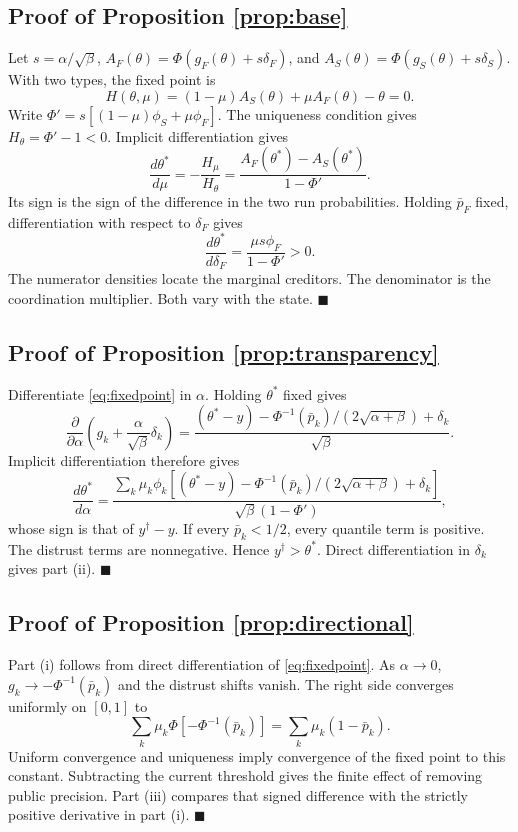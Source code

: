 \documentclass[11pt]{article}
\theoremstyle{definition}
\begin{document}
\subsection{Proof of Proposition \ref{prop:base}}
Let $s=\alpha/\sqrt\beta$, $A_F(\theta)=\Phi(g_F(\theta)+s\delta_F)$, and $A_S(\theta)=\Phi(g_S(\theta)+s\delta_S)$. With two types, the fixed point is
\[
H(\theta,\mu)=(1-\mu)A_S(\theta)+\mu A_F(\theta)-\theta=0.
\]
Write $\Phi'=s[(1-\mu)\phi_S+\mu\phi_F]$. The uniqueness condition gives $H_\theta=\Phi'-1<0$. Implicit differentiation gives
\[
\frac{d\theta^*}{d\mu}
=-\frac{H_\mu}{H_\theta}
=\frac{A_F(\theta^*)-A_S(\theta^*)}{1-\Phi'}.
\]
Its sign is the sign of the difference in the two run probabilities. Holding $\bar p_F$ fixed, differentiation with respect to $\delta_F$ gives
\[
\frac{d\theta^*}{d\delta_F}
=\frac{\mu s\phi_F}{1-\Phi'}>0.
\]
The numerator densities locate the marginal creditors. The denominator is the coordination multiplier. Both vary with the state. $\blacksquare$

\subsection{Proof of Proposition \ref{prop:transparency}}
Differentiate \eqref{eq:fixedpoint} in $\alpha$. Holding $\theta^*$ fixed gives
\[
\frac{\partial}{\partial\alpha}\left(g_k+\frac{\alpha}{\sqrt\beta}\delta_k\right)
=\frac{(\theta^*-y)-\Phi^{-1}(\bar p_k)/(2\sqrt{\alpha+\beta})+\delta_k}{\sqrt\beta}.
\]
Implicit differentiation therefore gives
\[
\frac{d\theta^*}{d\alpha}
=\frac{\sum_k\mu_k\phi_k\left[(\theta^*-y)-\Phi^{-1}(\bar p_k)/(2\sqrt{\alpha+\beta})+\delta_k\right]}{\sqrt\beta(1-\Phi')},
\]
whose sign is that of $y^\dagger-y$. If every $\bar p_k<1/2$, every quantile term is positive. The distrust terms are nonnegative. Hence $y^\dagger>\theta^*$. Direct differentiation in $\delta_k$ gives part (ii). $\blacksquare$

\subsection{Proof of Proposition \ref{prop:directional}}
Part (i) follows from direct differentiation of \eqref{eq:fixedpoint}. As $\alpha\to0$, $g_k\to-\Phi^{-1}(\bar p_k)$ and the distrust shifts vanish. The right side converges uniformly on $[0,1]$ to
\[
\sum_k\mu_k\Phi[-\Phi^{-1}(\bar p_k)]
=\sum_k\mu_k(1-\bar p_k).
\]
Uniform convergence and uniqueness imply convergence of the fixed point to this constant. Subtracting the current threshold gives the finite effect of removing public precision. Part (iii) compares that signed difference with the strictly positive derivative in part (i). $\blacksquare$
\end{document}
